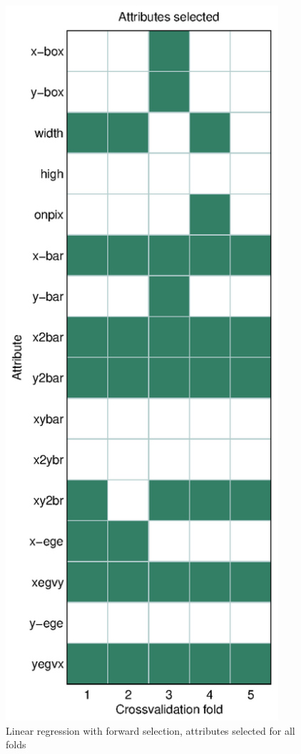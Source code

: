 \begin{figure}[htbp]
\center
\includegraphics[width = 0.9\textwidth]{figure_p2/r1.eps}
\caption{Linear regression with forward selection, attributes selected for all folds}
\end{figure}

